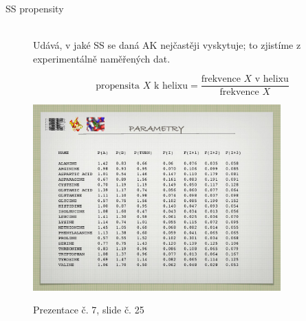 \documentclass[DIV=8]{scrreprt}
\begin{document}
\begin{description}
\item[SS propensity]\hfill \\
Udává, v jaké SS se daná AK nejčastěji vyskytuje; to zjistíme z experimentálně naměřených dat.

\[\text{propensita } X \text{ k helixu} = \frac{\text{frekvence } X \text{ v helixu}}{\text{frekvence } X}\]

\end{description}


\begin{figure}
    \caption{Prezentace č. 7, slide č. 25}
    \includegraphics[width=0.85\textwidth]{slides-7/slide-25.jpg}
    \centering
    \label{slides-7-slide-25}
\end{figure}
\end{document}
